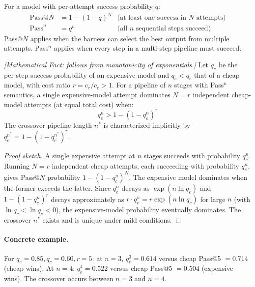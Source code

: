 \begin{definition}
\label{def:routing-pass}
For a model with per-attempt success probability $q$:
\begin{align}
\text{Pass@}N &= 1 - (1-q)^N & \text{(at least one success in $N$ attempts)} \\
\text{Pass}^n &= q^n & \text{(all $n$ sequential steps succeed)}
\end{align}
Pass@$N$ applies when the harness can select the best output from multiple attempts. Pass${}^n$ applies when every step in a multi-step pipeline must succeed.
\end{definition}

\begin{theorem}
\emph{[Mathematical Fact: follows from monotonicity of exponentials.]}
\label{thm:routing-crossover}
Let $q_e$ be the per-step success probability of an expensive model and $q_c < q_e$ that of a cheap model, with cost ratio $r = c_e / c_c > 1$. For a pipeline of $n$ stages with Pass${}^n$ semantics, a single expensive-model attempt dominates $N = r$ independent cheap-model attempts (at equal total cost) when:
\begin{equation}
q_e^n > 1 - (1 - q_c^n)^r
\end{equation}
The crossover pipeline length $n^*$ is characterized implicitly by $q_e^{n^*} = 1 - (1 - q_c^{n^*})^r$.
\end{theorem}

\begin{proof}[Proof sketch]
A single expensive attempt at $n$ stages succeeds with probability $q_e^n$. Running $N = r$ independent cheap attempts, each succeeding with probability $q_c^n$, gives Pass@$N$ probability $1 - (1 - q_c^n)^N$. The expensive model dominates when the former exceeds the latter. Since $q_e^n$ decays as $\exp(n \ln q_e)$ and $1 - (1 - q_c^n)^r$ decays approximately as $r \cdot q_c^n = r \exp(n \ln q_c)$ for large $n$ (with $\ln q_c < \ln q_e < 0$), the expensive-model probability eventually dominates. The crossover $n^*$ exists and is unique under mild conditions.
\end{proof}

\paragraph{Concrete example.} For $q_e = 0.85, q_c = 0.60, r = 5$: at $n = 3$, $q_e^3 = 0.614$ versus cheap Pass@5 $= 0.714$ (cheap wins). At $n = 4$: $q_e^4 = 0.522$ versus cheap Pass@5 $= 0.504$ (expensive wins). The crossover occurs between $n = 3$ and $n = 4$.

